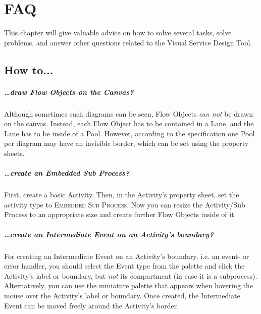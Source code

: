\chapter{FAQ}
\label{sec:user_faq}

This chapter will give valuable advice on how to solve several tasks, solve
problems, and answer other questions related to the Visual Service Design Tool.



\section{How to...}

\paragraph*{\dots draw Flow Objects on the Canvas?}
Although sometimes such diagrams can be seen, Flow Objects \emph{can not} be drawn
on the canvas.  Instead, each Flow Object has to be contained in a Lane, and the
Lane has to be inside of a Pool.  However, according to the specification one
Pool per diagram may have an invisible border, which can be set using the property
sheets.


\paragraph*{\dots create an Embedded Sub Process?}
First, create a basic Activity.  Then, in the Activity's property sheet, set the
activity type to \textsc{Embedded Sub Process}.  Now you can resize the Activity/Sub
Process to an appropriate size and create further Flow Objects inside of it.


\paragraph*{\dots create an Intermediate Event on an Activity's boundary?}
For creating an Intermediate Event on an Activity's boundary, i.e. an event- or
error handler, you should select the Event type from the palette and click the
Activity's label or boundary, but \emph{not} its compartment (in case it is a
subprocess).  Alternatively, you can use the miniature palette that appears when
hovering the mouse over the Activity's label or boundary.  Once created, the
Intermediate Event can be moved freely around the Activity's border.



